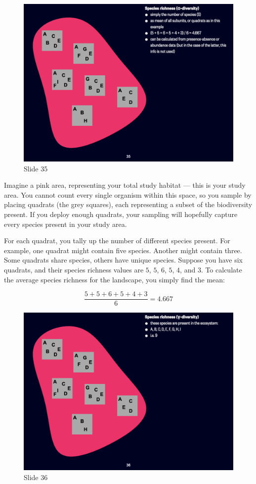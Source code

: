 \documentclass[
  10pt,
]{book}
\begin{document}
\begin{figure}[ht]
\centering
\includegraphics[width=0.8\linewidth]{../images/BDC334/BDC334-035.jpeg}
\caption*{Slide 35}
\end{figure}

Imagine a pink area, representing your total study habitat --- this is
your study area. You cannot count every single organism within this
space, so you sample by placing quadrats (the grey squares), each
representing a subset of the biodiversity present. If you deploy enough
quadrats, your sampling will hopefully capture every species present in
your study area.

For each quadrat, you tally up the number of different species present.
For example, one quadrat might contain five species. Another might
contain three. Some quadrats share species, others have unique species.
Suppose you have six quadrats, and their species richness values are
\(5\), \(5\), \(6\), \(5\), \(4\), and \(3\). To calculate the average
species richness for the landscape, you simply find the mean:

\[
\frac{5 + 5 + 6 + 5 + 4 + 3}{6} = 4.667
\]

\begin{figure}[ht]
\centering
\includegraphics[width=0.8\linewidth]{../images/BDC334/BDC334-036.jpeg}
\caption*{Slide 36}
\end{figure}
\end{document}
